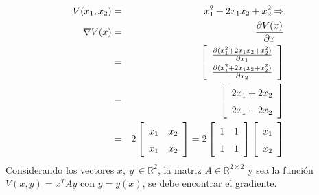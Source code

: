 \documentclass[12pt,spanish,lettersize]{report}
\begin{document}
\begin{eqnarray}
\nonumber V(x_1,x_2)&=&x_1^2+2x_1x_2+x_2^2\Rightarrow\\
\nonumber \nabla V(x)&=&\frac{\partial V(x)}{\partial x}\\
\nonumber &=&\left[\renewcommand{\arraystretch}{1.5}
\begin{array}{c}
\frac{\partial(x_1^2+2x_1x_2+x_2^2)}{\partial x_1}\\
\frac{\partial(x_1^2+2x_1x_2+x_2^2)}{\partial x_2}\\
\end{array}\right]\\
\nonumber &=&\left[\renewcommand{\arraystretch}{1.5}
\begin{array}{c}
2x_1+2x_2\\
2x_1+2x_2\\
\end{array}\right]\\
\nonumber &=&2\left[\renewcommand{\arraystretch}{1.5}
\begin{array}{cc}
x_1&x_2\\
x_1&x_2\\
\end{array}\right]=2\left[\renewcommand{\arraystretch}{1.5}
\begin{array}{cc}
1&1\\
1&1\\
\end{array}\right]\left[\renewcommand{\arraystretch}{1.5}
\begin{array}{c}
x_1\\
x_2\\
\end{array}\right]
\end{eqnarray}
Considerando los vectores $x,\ y\ \in\mathbb{R}^2$, la matriz $A\in\mathbb{R}^{2\times 2}$ y sea la funci\'on $V(x,y)=x^TAy$ con $y=y(x)$, se debe encontrar el gradiente.
\end{document}
